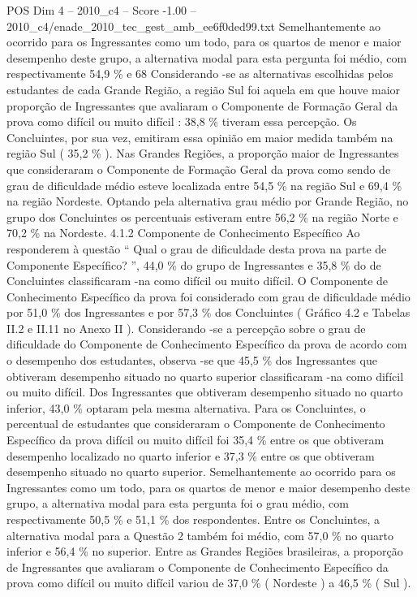 \begin{textsample}{POS Dim 4 – 2010\_c4 – Score -1.00 – 2010\_c4/enade\_2010\_tec\_gest\_amb\_ee6f0ded99.txt}
Semelhantemente ao ocorrido para os Ingressantes como um todo, para os quartos de menor e maior desempenho deste grupo, a alternativa modal para esta pergunta foi médio, com respectivamente 54,9 \% e 68 Considerando -se as alternativas escolhidas pelos estudantes de cada Grande Região, a região Sul foi aquela em que houve maior proporção de Ingressantes que avaliaram o Componente de Formação Geral da prova como difícil ou muito difícil : 38,8 \% tiveram essa percepção.
Os Concluintes, por sua vez, emitiram essa opinião em maior medida também na região Sul ( 35,2 \% ).
Nas Grandes Regiões, a proporção maior de Ingressantes que consideraram o Componente de Formação Geral da prova como sendo de grau de dificuldade médio esteve localizada entre 54,5 \% na região Sul e 69,4 \% na região Nordeste.
Optando pela alternativa grau médio por Grande Região, no grupo dos Concluintes os percentuais estiveram entre 56,2 \% na região Norte e 70,2 \% na Nordeste. 4.1.2 Componente de Conhecimento Específico Ao responderem à questão “ Qual o grau de dificuldade desta prova na parte de Componente Específico? ”, 44,0 \% do grupo de Ingressantes e 35,8 \% do de Concluintes classificaram -na como difícil ou muito difícil.
O Componente de Conhecimento Específico da prova foi considerado com grau de dificuldade médio por 51,0 \% dos Ingressantes e por 57,3 \% dos Concluintes ( Gráfico 4.2 e Tabelas II.2 e II.11 no Anexo II ).
Considerando -se a percepção sobre o grau de dificuldade do Componente de Conhecimento Específico da prova de acordo com o desempenho dos estudantes, observa -se que 45,5 \% dos Ingressantes que obtiveram desempenho situado no quarto superior classificaram -na como difícil ou muito difícil.
Dos Ingressantes que obtiveram desempenho situado no quarto inferior, 43,0 \% optaram pela mesma alternativa.
Para os Concluintes, o percentual de estudantes que consideraram o Componente de Conhecimento Específico da prova difícil ou muito difícil foi 35,4 \% entre os que obtiveram desempenho localizado no quarto inferior e 37,3 \% entre os que obtiveram desempenho situado no quarto superior.
Semelhantemente ao ocorrido para os Ingressantes como um todo, para os quartos de menor e maior desempenho deste grupo, a alternativa modal para esta pergunta foi o grau médio, com respectivamente 50,5 \% e 51,1 \% dos respondentes.
Entre os Concluintes, a alternativa modal para a Questão 2 também foi médio, com 57,0 \% no quarto inferior e 56,4 \% no superior.
Entre as Grandes Regiões brasileiras, a proporção de Ingressantes que avaliaram o Componente de Conhecimento Específico da prova como difícil ou muito difícil variou de 37,0 \% ( Nordeste ) a 46,5 \% ( Sul ).

\end{textsample}
